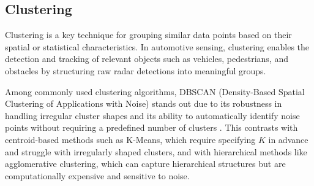 
\newpage
\subsection{Clustering}
Clustering is a key technique for grouping similar data points based on their spatial or statistical characteristics. 
In automotive sensing, clustering enables the detection and tracking of relevant objects such as vehicles, pedestrians, and obstacles by structuring raw radar detections into meaningful groups.

Among commonly used clustering algorithms, DBSCAN (Density-Based Spatial Clustering of Applications with Noise) stands out due to its robustness in handling irregular cluster shapes and its ability to automatically identify noise points without requiring a predefined number of clusters \cite{geeksforgeeks_dbscan}. 
This contrasts with centroid-based methods such as K-Means, which require specifying $K$ in advance and struggle with irregularly shaped clusters, and with hierarchical methods like agglomerative clustering, which can capture hierarchical structures but are computationally expensive and sensitive to noise.

